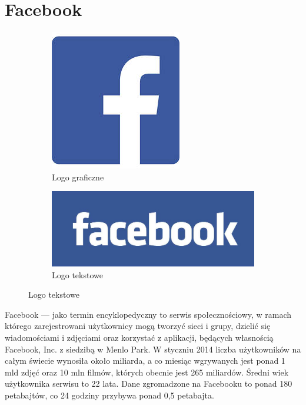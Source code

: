 \section{Facebook}
\label{sec:facebook}


\begin{figure}[!h]
\centering
\begin{subfigure}{.5\textwidth}
  \centering
  \includegraphics[width=.4\linewidth]{images/lukasz/pobrane.jpg}
  \caption{Logo graficzne}
  \label{fig:facebook-logo-graficzne}
\end{subfigure}%
\begin{subfigure}{.5\textwidth}
  \centering
  \includegraphics[width=.4\linewidth]{images/lukasz/facebook-logo.jpg}
  \caption{Logo tekstowe}
  \label{fig:facebook-logo-tekstowe}
\end{subfigure}
\label{fig:logo-facebook}
\end{figure}


Facebook --- jako termin encyklopedyczny to serwis społecznościowy, w ramach którego zarejestrowani użytkownicy mogą tworzyć sieci i grupy, dzielić się wiadomościami i zdjęciami oraz korzystać z aplikacji, będących własnością Facebook, Inc. z siedzibą w Menlo Park. W styczniu 2014 liczba użytkowników na całym świecie wynosiła około miliarda, a co miesiąc wgrywanych jest ponad 1 mld zdjęć oraz 10 mln filmów, których obecnie jest 265 miliardów. Średni wiek użytkownika serwisu to 22 lata. Dane zgromadzone na Facebooku to ponad 180 petabajtów, co 24 godziny przybywa ponad 0,5 petabajta.

